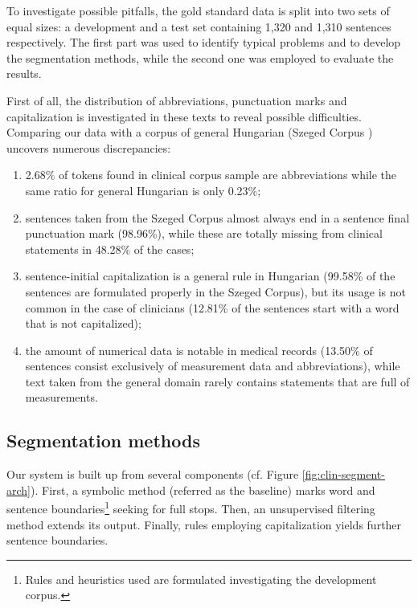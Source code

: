 To investigate possible pitfalls, the gold standard data is split into two sets of equal sizes: a development and a test set containing 1,320 and 1,310 sentences respectively. 
The first part was used to identify typical problems and to develop the segmentation methods, while the second one was employed to evaluate the results. 

First of all, the distribution of abbreviations, punctuation marks and capitalization is investigated in these texts to reveal possible difficulties. 
Comparing our data with a corpus of general Hungarian (Szeged Corpus \cite{Csendes2004}) uncovers numerous discrepancies: 
\begin{enumerate}
 \item 2.68\% of tokens found in clinical corpus sample are abbreviations while the same ratio for general Hungarian is only 0.23\%; 
 \item sentences taken from the Szeged Corpus almost always end in a sentence final punctuation mark (98.96\%), while these are totally missing from clinical statements in 48.28\% of the cases; 
 \item sentence-initial capitalization is a general rule in Hungarian (99.58\% of the sentences are formulated properly in the Szeged Corpus), but its usage is not common in the case of clinicians (12.81\% of the sentences start with a word that is not capitalized); 
 \item the amount of numerical data is notable in medical records (13.50\% of sentences consist exclusively of measurement data and abbreviations), while text taken from the general domain rarely contains statements that are full of measurements. 
\end{enumerate}




\subsection{Segmentation methods}
\label{sec:clinical_segmentation}

Our system is built up from several components (cf. Figure \ref{fig:clin-segment-arch}). 
First, a symbolic method (referred as the baseline) marks word and sentence boundaries\footnote{Rules and heuristics used are formulated investigating the development corpus.} seeking for full stops. 
Then, an unsupervised filtering method extends its output.
Finally, rules employing capitalization yields further sentence boundaries.

